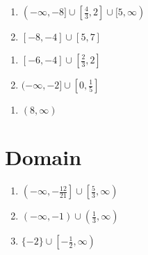 \begin{multicols}{2}
\begin{enumerate}	\setcounter{enumi}{\value{Review}}
    \item $(-\infty, -8] \cup \left[\frac{4}{3}, 2\right] \cup [5, \infty)$
    \item $[-8, -4] \cup [5, 7]$
\end{enumerate} \setcounter{Review}{\value{enumi}}
\end{multicols}
\begin{multicols}{2}
\begin{enumerate}	\setcounter{enumi}{\value{Review}}
    \item $[-6, -4] \cup \left[\frac{2}{3}, 2\right]$
    \item $(-\infty, -2] \cup \left[0, \frac{1}{5}\right]$
\end{enumerate}	\setcounter{Review}{\value{enumi}}
\end{multicols}
\begin{multicols}{2}
\begin{enumerate}	\setcounter{enumi}{\value{Review}}
    \item $(8, \infty)$
\end{enumerate}	\setcounter{Review}{\value{enumi}}
\end{multicols}

\section*{Domain}
\begin{enumerate}
	\item $\left(-\infty, -\frac{12}{21}\right] \cup \left[\frac{5}{3}, \infty\right)$
	\item $(-\infty, -1) \cup \left(\frac{1}{3}, \infty\right)$
	\item $\{-2\} \cup \left[-\frac{1}{2}, \infty\right)$
\end{enumerate}

